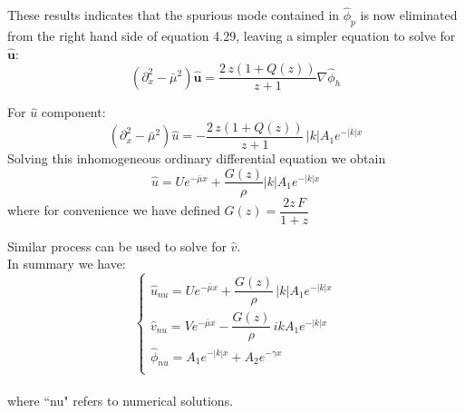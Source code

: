 These results indicates that the spurious mode contained in $\hat{\phi}_p$ is now eliminated from the right hand side of equation 4.29, leaving a simpler equation to solve for $\hat{\textbf{u}}$:
\begin{equation}
(\partial_x^2 - \bar{\mu}^2) \hat{\textbf{u}} = \dfrac{2\, z (1+ Q(z))}{z + 1} \nabla \hat{\phi}_h
\end{equation}

For $\hat{u}$ component:
\begin{equation*}
(\partial_x^2 - \bar{\mu}^2) \hat{u} = - \dfrac{2 \, z (1+ Q(z))}{z + 1} \, |k| A_1 e^{- |k| x}
\end{equation*}
Solving this inhomogeneous ordinary differential equation we obtain
\begin{dmath*}
\hat{u} = U e^{-\bar{\mu} x} + \dfrac{G(z)}{\rho} |k| A_1 e^{- |k| x}
\end{dmath*}
where for convenience we have defined $G(z) = \dfrac{2z\,F}{1+z}$

Similar process can be used to solve for $\hat{v}$.\\

In summary we have:
\begin{equation}
\begin{cases}
\hat{u}_{nu} = U e^{-\bar{\mu} x} + \dfrac{G(z)}{\rho} \, |k| A_1 e^{- |k| x} \\
\hat{v}_{nu} = V e^{-\bar{\mu} x} - \dfrac{G(z)}{\rho} \, i k A_1 e^{- |k| x} \\
\hat{\phi}_{nu} = A_1 e^{- |k| x} + A_2 e^{- \gamma x} \\
\end{cases}
\end{equation}\\
where ``nu" refers to numerical solutions.\\

